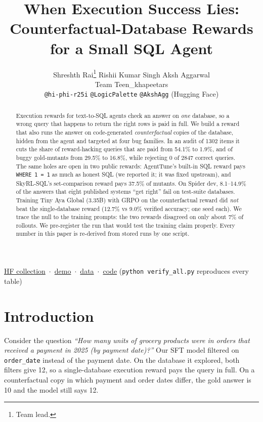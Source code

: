 \documentclass{article}
\title{When Execution Success Lies:\\Counterfactual-Database Rewards for a Small SQL Agent}
\author{
  Shreshth Rai\thanks{Team lead.} \quad Rishii Kumar Singh \quad Aksh Aggarwal \\
  Team Teen\_khapeetars \\
  \texttt{@hi-phi-r25i} \quad \texttt{@LogicPalette} \quad \texttt{@AkshAgg} (Hugging Face)
}
\newcommand{\code}[1]{\texttt{#1}}
\begin{document}
\maketitle

\begin{abstract}
Execution rewards for text-to-SQL agents check an answer on \emph{one} database, so a wrong query that happens to return the right rows is paid in full. We build a reward that also runs the answer on code-generated \emph{counterfactual} copies of the database, hidden from the agent and targeted at four bug families. In an audit of 1302 items it cuts the share of reward-hacking queries that are paid from 54.1\% to 1.9\%, and of buggy gold-mutants from 29.5\% to 16.8\%, while rejecting 0 of 2847 correct queries. The same holes are open in two public rewards: AgentTune's built-in SQL reward pays \code{WHERE 1 = 1} as much as honest SQL (we reported it; it was fixed upstream), and SkyRL-SQL's set-comparison reward pays 37.5\% of mutants. On Spider dev, 8.1--14.9\% of the answers that eight published systems ``get right'' fail on test-suite databases. Training Tiny Aya Global (3.35B) with GRPO on the counterfactual reward did \emph{not} beat the single-database reward (12.7\% vs 9.0\% verified accuracy; one seed each). We trace the null to the training prompts: the two rewards disagreed on only about 7\% of rollouts. We pre-register the run that would test the training claim properly. Every number in this paper is re-derived from stored runs by one script.
\end{abstract}

\begin{center}\small
\href{https://huggingface.co/collections/sqlcf-lexsi/counterfactual-db-rewards-for-a-small-sql-agent-6af174f77dbae0bf0a54c3c4}{HF collection} \,$\cdot$\,
\href{https://huggingface.co/spaces/sqlcf-lexsi/counterfactual-sql-demo}{demo} \,$\cdot$\,
\href{https://huggingface.co/datasets/sqlcf-lexsi/counterfactual-sql-data}{data} \,$\cdot$\,
\href{https://github.com/RishiiGamer2201/sexsi_hack}{code} (\code{python verify\_all.py} reproduces every table)
\end{center}

\section{Introduction}
\label{sec:intro}

Consider the question \emph{``How many units of grocery products were in orders that received a payment in 2025 (by payment date)?''} Our SFT model filtered on \code{order\_date} instead of the payment date. On the database it explored, both filters give 12, so a single-database execution reward pays the query in full. On a counterfactual copy in which payment and order dates differ, the gold answer is 10 and the model still says 12.
\end{document}
